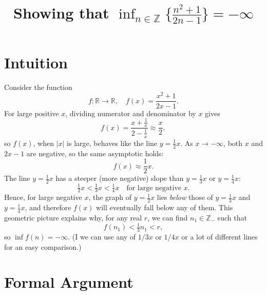\documentclass[11pt]{article}
\title{Showing that \(\displaystyle \inf_{n\in\mathbb{Z}} \big\{ \frac{n^2+1}{2n-1}\big\} =-\infty\) }
\date{}
\begin{document}
\maketitle

\section*{Intuition}

Consider the function
\[
f:\mathbb{R}\to \mathbb{R}, \quad f(x)=\frac{x^2+1}{2x-1}.
\]
For large positive \(x\), dividing numerator and denominator by \(x\) gives
\[
f(x)=\frac{x+\frac{1}{x}}{2-\frac{1}{x}} \approx \frac{x}{2},
\]
so \(f(x)\), when $|x|$ is large, behaves like the line \(y=\tfrac12 x\). As \(x\to -\infty\), both \(x\) and \(2x-1\) are negative, so the same asymptotic holds:
\[
f(x)\approx \frac{1}{2}x.
\]
The line \(y=\tfrac12 x\) has a steeper (more negative) slope than \(y=\tfrac13 x\) or \(y=\tfrac14 x\):
\[
\tfrac12x < \tfrac13x < \tfrac14x\quad\text{for large negative }x.
\]
Hence, for large negative \(x\), the graph of \(y=\tfrac12x\) lies \emph{below} those of \(y=\tfrac13x\) and \(y=\tfrac14x\), and therefore \(f(x)\) will eventually fall below any of them.
This geometric picture explains why, for any real \(r\), we can find \(n_1\in\mathbb{Z}_{-}\) such that
\[
f(n_1) < \tfrac13 n_1 < r,
\]
so \(\inf f(n)=-\infty.\) (I we can use any of $1/3x$ or $1/4 x$ or a lot of different lines for an easy comparison.)

\begin{center}
\end{center}

\bigskip

\section*{Formal Argument}
\end{document}
